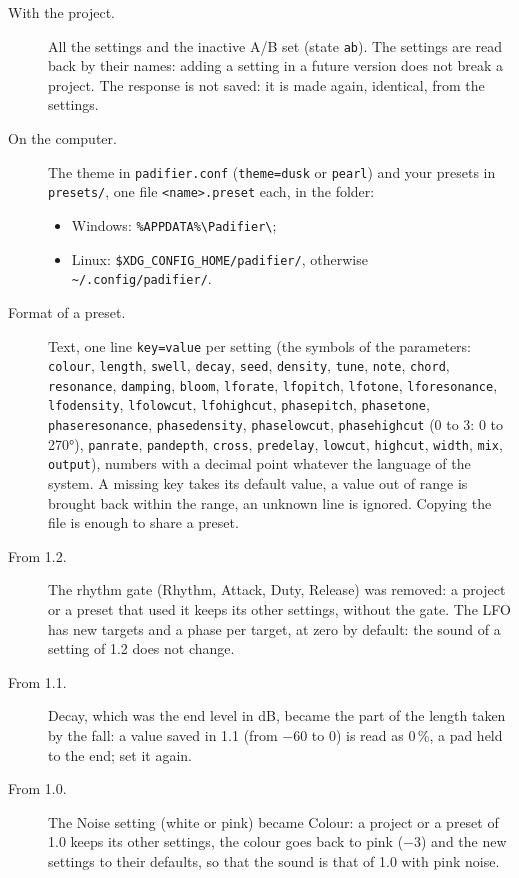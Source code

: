 \documentclass[a4paper,11pt]{article}
\begin{document}
\begin{description}
\item[With the project.] All the settings and the inactive A/B set (state \texttt{ab}). The
  settings are read back by their names: adding a setting in a future version does not break a
  project. The response is not saved: it is made again, identical, from the settings.
\item[On the computer.] The theme in \texttt{padifier.conf} (\texttt{theme=dusk} or
  \texttt{pearl}) and your presets in \texttt{presets/}, one file \texttt{<name>.preset} each, in
  the folder:
  \begin{itemize}
  \item Windows: \verb|%APPDATA%\Padifier\|;
  \item Linux: \verb|$XDG_CONFIG_HOME/padifier/|, otherwise \verb|~/.config/padifier/|.
  \end{itemize}
\item[Format of a preset.] Text, one line \texttt{key=value} per setting (the symbols of the
  parameters: \texttt{colour}, \texttt{length}, \texttt{swell}, \texttt{decay}, \texttt{seed},
  \texttt{density}, \texttt{tune}, \texttt{note}, \texttt{chord}, \texttt{resonance},
  \texttt{damping}, \texttt{bloom}, \texttt{lforate}, \texttt{lfopitch}, \texttt{lfotone},
  \texttt{lforesonance}, \texttt{lfodensity}, \texttt{lfolowcut}, \texttt{lfohighcut},
  \texttt{phasepitch}, \texttt{phasetone}, \texttt{phaseresonance}, \texttt{phasedensity},
  \texttt{phaselowcut}, \texttt{phasehighcut} (0 to 3: 0 to 270°), \texttt{panrate}, \texttt{pandepth}, \texttt{cross},
  \texttt{predelay}, \texttt{lowcut}, \texttt{highcut}, \texttt{width}, \texttt{mix},
  \texttt{output}), numbers with a decimal point whatever the language of the system. A missing
  key takes its default value, a value out of range is brought back within the range, an unknown
  line is ignored. Copying the file is enough to share a preset.
\item[From 1.2.] The rhythm gate (Rhythm, Attack, Duty, Release) was removed: a project or a
  preset that used it keeps its other settings, without the gate. The LFO has new targets and a
  phase per target, at zero by default: the sound of a setting of 1.2 does not change.
\item[From 1.1.] Decay, which was the end level in dB, became the part of the length taken by
  the fall: a value saved in 1.1 (from $-60$ to 0) is read as 0\,\%, a pad held to the end; set it
  again.
\item[From 1.0.] The Noise setting (white or pink) became Colour: a project or a preset of 1.0 keeps
  its other settings, the colour goes back to pink ($-3$) and the new settings to their defaults,
  so that the sound is that of 1.0 with pink noise.
\end{description}
\end{document}
